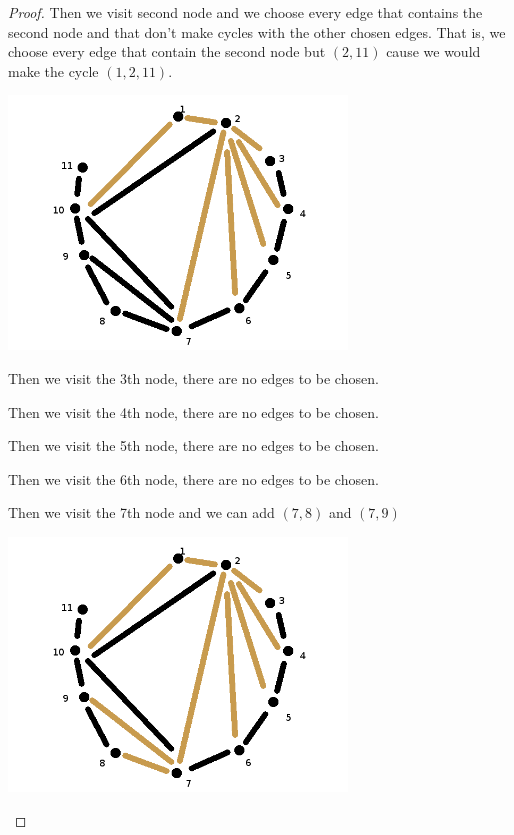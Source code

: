 \begin{proof}
    Then we visit second node and we choose every edge that contains the second node and that don't make cycles with the other chosen edges. That is, 
    we choose every edge that contain the second node but $(2, 11)$ cause we would make the cycle $(1, 2, 11)$. 
    \begin{center}
        \includegraphics[width=9cm]{Homework1/Problem4/TriangulationToPlanarRootedTree4.png}
    \end{center}
    
    Then we visit the 3th node, there are no edges to be chosen.\pn
    
    Then we visit the 4th node, there are no edges to be chosen.\pn
    
    Then we visit the 5th node, there are no edges to be chosen.\pn
    
    Then we visit the 6th node, there are no edges to be chosen.\pn
    
    Then we visit the 7th node and we can add $(7, 8)$ and $(7, 9)$
    \begin{center}
        \includegraphics[width=9cm]{Homework1/Problem4/TriangulationToPlanarRootedTree5.png}
    \end{center}
    

\end{proof}
